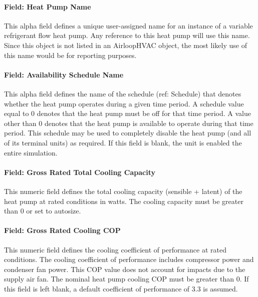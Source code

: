 \paragraph{Field: Heat Pump Name}\label{field-heat-pump-name}

This alpha field defines a unique user-assigned name for an instance of a variable refrigerant flow heat pump. Any reference to this heat pump will use this name. Since this object is not listed in an AirloopHVAC object, the most likely use of this name would be for reporting purposes.

\paragraph{Field: Availability Schedule Name}\label{field-availability-schedule-name-018}

This alpha field defines the name of the schedule (ref: Schedule) that denotes whether the heat pump operates during a given time period. A schedule value equal to 0 denotes that the heat pump must be off for that time period. A value other than 0 denotes that the heat pump is available to operate during that time period. This schedule may be used to completely disable the heat pump (and all of its terminal units) as required. If this field is blank, the unit is enabled the entire simulation.

\paragraph{Field: Gross Rated Total Cooling Capacity}\label{field-gross-rated-total-cooling-capacity-001}

This numeric field defines the total cooling capacity (sensible + latent) of the heat pump at rated conditions in watts. The cooling capacity must be greater than 0 or set to autosize.

\paragraph{Field: Gross Rated Cooling COP}\label{field-gross-rated-cooling-cop-001}

This numeric field defines the cooling coefficient of performance at rated conditions. The cooling coefficient of performance includes compressor power and condenser fan power. This COP value does not account for impacts due to the supply air fan. The nominal heat pump cooling COP must be greater than 0. If this field is left blank, a default coefficient of performance of 3.3 is assumed.

